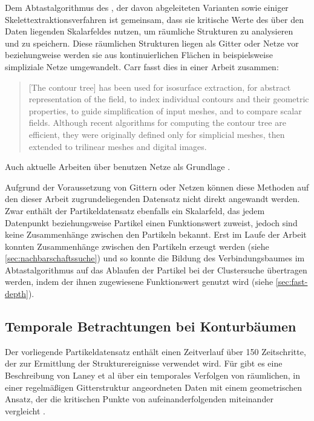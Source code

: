 Dem Abtastalgorithmus des , der davon abgeleiteten Varianten sowie einiger Skelettextraktionsverfahren ist gemeinsam, dass sie kritische Werte des über den Daten liegenden Skalarfeldes nutzen, um räumliche Strukturen zu analysieren und zu speichern. Diese räumlichen Strukturen liegen als Gitter oder Netze vor beziehungweise werden sie aus kontinuierlichen Flächen in beispielsweise simpliziale Netze umgewandelt. Carr fasst dies in einer Arbeit zusammen:
\blockcquote[1]{carr2009representingInterpolantTopology}{[The contour tree] has been used for isosurface extraction, for abstract representation of the field, to index individual contours and their geometric properties, to guide simplification of input meshes, and to compare scalar fields.
Although recent algorithms for computing the contour tree are efficient, they were originally defined only for simplicial meshes, then extended to trilinear meshes and digital images.}
Auch aktuelle Arbeiten über  benutzen Netze als Grundlage \cite{raichel2014avoidingGlobalSort} \cite{acharya2015memoryEfficientCT}.

Aufgrund der Voraussetzung von Gittern oder Netzen können diese Methoden auf den dieser Arbeit zugrundeliegenden Datensatz nicht direkt angewandt werden. Zwar enthält der Partikeldatensatz ebenfalls ein Skalarfeld, das jedem Datenpunkt beziehungsweise Partikel einen Funktionswert zuweist, jedoch sind keine Zusammenhänge zwischen den Partikeln bekannt. Erst im Laufe der Arbeit konnten Zusammenhänge zwischen den Partikeln erzeugt werden (siehe \autoref{sec:nachbarschaftssuche}) und so konnte die Bildung des Verbindungsbaumes im Abtastalgorithmus auf das Ablaufen der Partikel bei der Clustersuche übertragen werden, indem der ihnen zugewiesene Funktionswert genutzt wird (siehe \autoref{sec:fast-depth}).

\subsection*{Temporale Betrachtungen bei Konturbäumen}\label{sec:related:konturbaumTemporal}
Der vorliegende Partikeldatensatz enthält einen Zeitverlauf über 150 Zeitschritte, der zur Ermittlung der Strukturereignisse verwendet wird. Für  gibt es eine Beschreibung von Laney et al über ein temporales Verfolgen von räumlichen, in einer regelmäßigen Gitterstruktur angeordneten Daten mit einem geometrischen Ansatz, der die kritischen Punkte von aufeinanderfolgenden  miteinander vergleicht \cite[S.~1056]{laney2006turbulentMixingLayer}.

